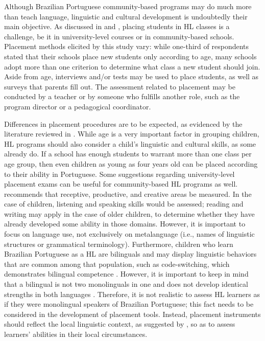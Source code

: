 \documentclass[output=paper]{langscibook}
\begin{document}
\begin{sloppypar}
  Although Brazilian Portuguese community-based programs may do much more than teach language, linguistic and cultural development is undoubtedly their main objective. As discussed in  and , placing students in HL classes is a challenge, be it in university-level courses or in community-based schools. Placement methods elicited by this study vary: while one-third of respondents stated that their schools place new students only according to age, many schools adopt more than one criterion to determine what class a new student should join. Aside from age, interviews and/or tests may be used to place students, as well as surveys that parents fill out. The assessment related to placement may be conducted by a teacher or by someone who fulfills another role, such as the program director or a pedagogical coordinator.
\end{sloppypar}

  Differences in placement procedures are to be expected, as evidenced by the literature reviewed in . While age is a very important factor in grouping children, HL programs should also consider a child’s linguistic and cultural skills, as some already do. If a school has enough students to warrant more than one class per age group, then even children as young as four years old can be placed according to their ability in Portuguese. Some suggestions regarding university-level placement exams can be useful for community-based HL programs as well. \citet{Fairclough2012a} recommends that receptive, productive, and creative areas be measured. In the case of children, listening and speaking skills would be assessed; reading and writing may apply in the case of older children, to determine whether they have already developed some ability in those domains. However, it is important to focus on language use, not exclusively on metalanguage (i.e., names of linguistic structures or grammatical terminology). Furthermore, children who learn Brazilian Portuguese as a HL are bilinguals and may display linguistic behaviors that are common among that population, such as code-switching, which demonstrates bilingual competence \citep{Carvalho2012}. However, it is important to keep in mind that a bilingual is not two monolinguals in one and does not develop identical strengths in both languages \citep{Valdés2001}. Therefore, it is not realistic to assess HL learners as if they were monolingual speakers of Brazilian Portuguese; this fact needs to be considered in the development of placement tools. Instead, placement instruments should reflect the local linguistic context, as suggested by \citet{MacGregor-Mendoza2012}, so as to assess learners’ abilities in their local circumstances.
\end{document}
